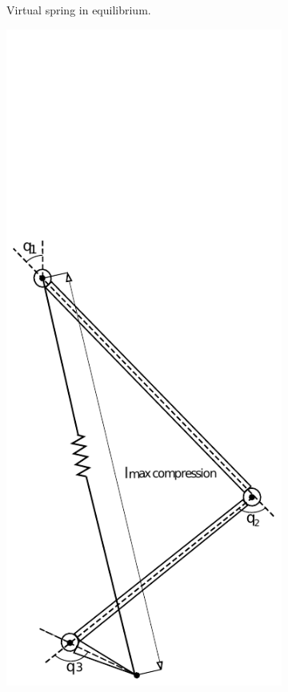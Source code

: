 \begin{figure}[ht!]
\begin{subfigure}[b]{0.25\textwidth}
        \caption{Virtual spring in equilibrium.}
        \label{fig:virtual_spring1}
    \end{subfigure}
    \begin{subfigure}[b]{0.25\textwidth}
        \includegraphics[width=\textwidth]{figures/spring_model_max_compressed.pdf}

\end{subfigure}
\end{figure}
